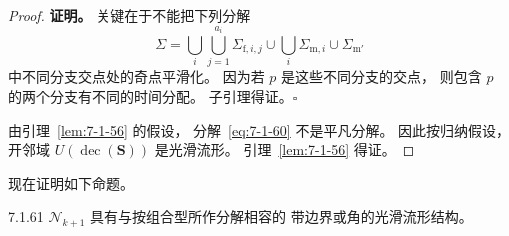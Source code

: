 \begin{proof}
\noindent\textbf{证明。}
关键在于不能把下列分解
\begin{equation}
\Sigma=
\bigcup_i\bigcup_{j=1}^{a_i}
\Sigma_{\mathrm f,i,j}
\cup
\bigcup_i\Sigma_{\mathrm m,i}
\cup\Sigma_{\mathrm m'}
\tag{7.1.60}\label{eq:7-1-60}
\end{equation}
中不同分支交点处的奇点平滑化。
因为若 $p$ 是这些不同分支的交点，
则包含 $p$ 的两个分支有不同的时间分配。
子引理得证。\hfill$\square$

由引理~\ref{lem:7-1-56}
的假设，
分解~\eqref{eq:7-1-60}
不是平凡分解。
因此按归纳假设，
开邻域
$U(\operatorname{dec}(\mathbf S))$
是光滑流形。
引理~\ref{lem:7-1-56} 得证。
\end{proof}

现在证明如下命题。

\begin{proposition}{7.1.61}\label{prop:7-1-61}
$\mathcal N_{k+1}$
具有与按组合型所作分解相容的
带边界或角的光滑流形结构。
\end{proposition}

